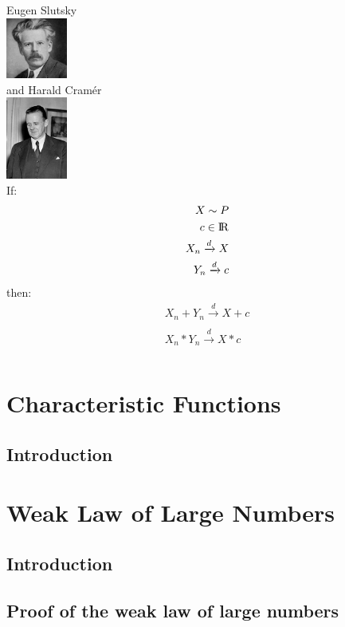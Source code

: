 \documentclass[10pt,a4paper]{book}
\begin{document}
	Eugen Slutsky\\
	\includegraphics[width=2cm]{EugenSlutsky}\\
	
	and Harald Cramér\\
	\includegraphics[width=2cm]{HaraldCramer}\\
	
	If:
	\begin{align}
	X \sim P\\
	c \in \rm I\!R\\
	X_n \xrightarrow[]{d} X\\
	Y_n \xrightarrow[]{d} c\\
	\end{align}
	then:
	\begin{align}
	X_n + Y_n \xrightarrow[]{d} X + c\\
	X_n * Y_n \xrightarrow[]{d} X * c\\
	\end{align}
	
	\chapter{Characteristic Functions}
	\section{Introduction}

	\chapter{Weak Law of Large Numbers}
	\section{Introduction}
	\section{Proof of the weak law of large numbers}
\end{document}

